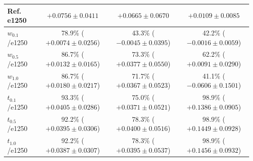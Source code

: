 \begin{table}[t]
\begin{tabular}{p{1.5cm}ccc}
\midrule
Ref. e1250 & $+0.0756 \pm 0.0411$ & $+0.0665 \pm 0.0670$ & $+0.0109 \pm 0.0085$ \\ \hline
$w_{0.1}$/e1250 & \makecell{78.9\% \\ ($+0.0074 \pm 0.0256$)} & \makecell{43.3\% \\ ($-0.0045 \pm 0.0395$)} & \makecell{42.2\% \\ ($-0.0016 \pm 0.0059$)} \\ \hdashline
$w_{0.5}$/e1250 & \makecell{86.7\% \\ ($+0.0132 \pm 0.0165$)} & \makecell{73.3\% \\ ($+0.0377 \pm 0.0550$)} & \makecell{62.2\% \\ ($+0.0091 \pm 0.0290$)} \\ \hdashline
$w_{1.0}$/e1250 & \makecell{86.7\% \\ ($+0.0180 \pm 0.0217$)} & \makecell{71.7\% \\ ($+0.0367 \pm 0.0523$)} & \makecell{41.1\% \\ ($-0.0606 \pm 0.1501$)} \\ \hdashline
$t_{0.1}$/e1250 & \makecell{93.3\% \\ ($+0.0405 \pm 0.0286$)} & \makecell{75.0\% \\ ($+0.0371 \pm 0.0521$)} & \makecell{98.9\% \\ ($+0.1386 \pm 0.0905$)} \\ \hdashline
$t_{0.5}$/e1250 & \makecell{92.2\% \\ ($+0.0395 \pm 0.0306$)} & \makecell{78.3\% \\ ($+0.0400 \pm 0.0516$)} & \makecell{98.9\% \\ ($+0.1449 \pm 0.0928$)} \\ \hdashline
$t_{1.0}$/e1250 & \makecell{92.2\% \\ ($+0.0387 \pm 0.0307$)} & \makecell{78.3\% \\ ($+0.0395 \pm 0.0537$)} & \makecell{98.9\% \\ ($+0.1456 \pm 0.0932$)} \\
\bottomrule
\end{tabular}
\end{table}

